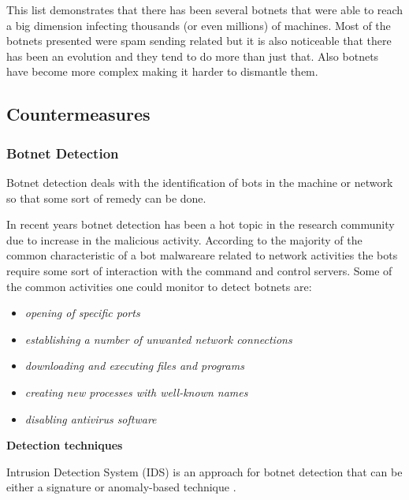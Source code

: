 \documentclass[]{article}
\begin{document}
This list demonstrates that there has been several botnets that were able to reach a big dimension infecting thousands (or even millions) of machines. Most of the botnets presented were spam sending related but it is also noticeable that there has been an evolution and they tend to do more than just that. Also botnets have become more complex making it harder to dismantle them.

\subsection{Countermeasures}

\subsubsection{Botnet Detection}

Botnet detection deals with the identification of bots in the machine or network so that some sort of remedy can be done.

In recent years botnet detection has been a hot topic in the research community due to increase in the malicious activity. According to the majority of the common characteristic of a bot malwareare related to network activities the bots require some sort of interaction with the command and control servers. Some of the common activities one could monitor to detect botnets are:

\begin{itemize}
	\item \textit{opening of specific ports}
	\item \textit{establishing a number of unwanted network connections}
	\item \textit{downloading and executing files and programs}
	\item \textit{creating new processes with well-known names}
	\item \textit{disabling antivirus software}
\end{itemize}

\textbf{Detection techniques}

Intrusion Detection System (IDS) is an approach for botnet detection that can be either a signature or anomaly-based technique \cite{website:ids}.
\end{document}
